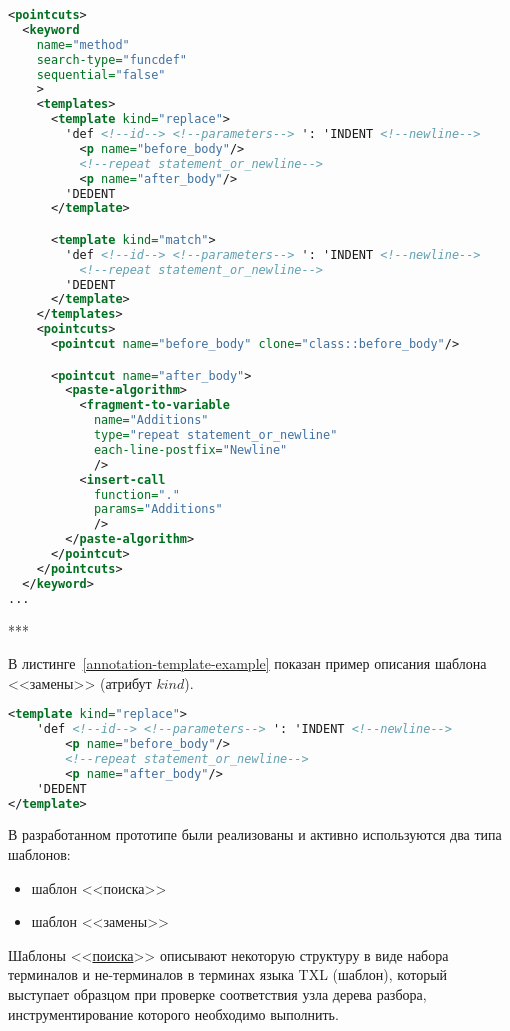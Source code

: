 \begin{lstlisting}[frame=single, language=XML, label={annotation-pointcuts-example}, caption={Пример}]
<pointcuts>
  <keyword
    name="method"
    search-type="funcdef"
    sequential="false"
    >
    <templates>
      <template kind="replace">
        'def <!--id--> <!--parameters--> ': 'INDENT <!--newline-->
          <p name="before_body"/>
          <!--repeat statement_or_newline-->
          <p name="after_body"/>
        'DEDENT
      </template>

      <template kind="match">
        'def <!--id--> <!--parameters--> ': 'INDENT <!--newline-->
          <!--repeat statement_or_newline-->
        'DEDENT
      </template>
    </templates>
    <pointcuts>
      <pointcut name="before_body" clone="class::before_body"/>

      <pointcut name="after_body">
        <paste-algorithm>
          <fragment-to-variable
            name="Additions"
            type="repeat statement_or_newline"
            each-line-postfix="Newline"
            />
          <insert-call
            function="."
            params="Additions"
            />
        </paste-algorithm>
      </pointcut>
    </pointcuts>
  </keyword>
...
\end{lstlisting}

***

В листинге~\ref{annotation-template-example} показан пример описания шаблона <<замены>> (атрибут $kind$).

\begin{lstlisting}[frame=single, language=XML, label={annotation-template-example}, caption={Пример}]
<template kind="replace">
    'def <!--id--> <!--parameters--> ': 'INDENT <!--newline-->
        <p name="before_body"/>
        <!--repeat statement_or_newline-->
        <p name="after_body"/>
    'DEDENT
</template>
\end{lstlisting}

В разработанном прототипе были реализованы и активно используются два типа шаблонов:
\begin{itemize}[noitemsep]
  \item шаблон <<поиска>>
  \item шаблон <<замены>>
\end{itemize}

Шаблоны <<\underline{поиска}>> описывают некоторую структуру в виде набора терминалов и не-терминалов в терминах языка TXL (шаблон), который выступает образцом при проверке соответствия узла дерева разбора, инструментирование которого необходимо выполнить.


